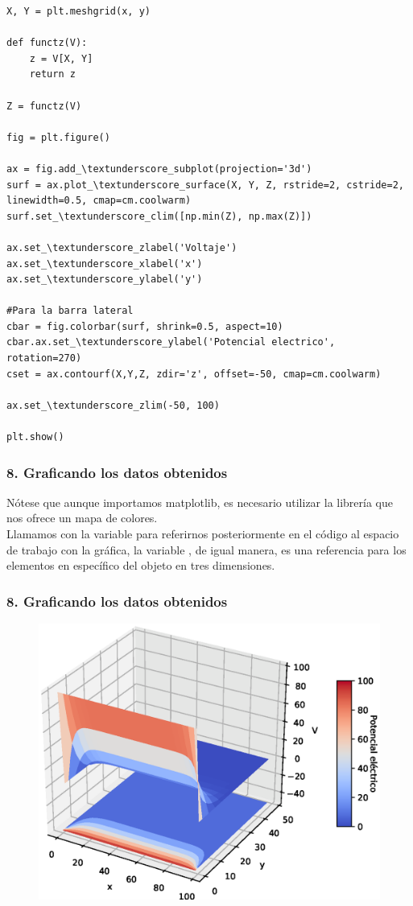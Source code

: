 \documentclass[12pt]{beamer}
\begin{document}
{\begin{frame}
\begin{lstlisting}[caption=Graficando la solución, style=FormattedNumber, basicstyle=\linespread{1.1}\ttfamily=\small, columns=fullflexible]
X, Y = plt.meshgrid(x, y)

def functz(V):
    z = V[X, Y]
    return z

Z = functz(V)

fig = plt.figure()

ax = fig.add_\textunderscore_subplot(projection='3d')
surf = ax.plot_\textunderscore_surface(X, Y, Z, rstride=2, cstride=2, linewidth=0.5, cmap=cm.coolwarm)
surf.set_\textunderscore_clim([np.min(Z), np.max(Z)])

ax.set_\textunderscore_zlabel('Voltaje')
ax.set_\textunderscore_xlabel('x')
ax.set_\textunderscore_ylabel('y')

#Para la barra lateral
cbar = fig.colorbar(surf, shrink=0.5, aspect=10)
cbar.ax.set_\textunderscore_ylabel('Potencial electrico', rotation=270)
cset = ax.contourf(X,Y,Z, zdir='z', offset=-50, cmap=cm.coolwarm)

ax.set_\textunderscore_zlim(-50, 100)

plt.show()
\end{lstlisting}
\end{frame}
}
\begin{frame}
\frametitle{8. Graficando los datos obtenidos}
Nótese que aunque importamos matplotlib, es necesario utilizar la librería  que nos ofrece un mapa de colores.
\\
\medskip
Llamamos con la variable  para referirnos posteriormente en el código al espacio de trabajo con la gráfica, la variable , de igual manera, es una referencia para los elementos en específico del objeto en tres dimensiones.
\end{frame}
{
\begin{frame}[fragile]
\frametitle{8. Graficando los datos obtenidos}
\begin{figure}
	\centering
	\includegraphics[scale=0.6]{Imagenes/Solucion_Laplace_01.eps} 
\end{figure}
\end{frame}
}
\end{document}
